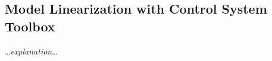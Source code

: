 \subsection{Model Linearization with Control System Toolbox}\label{app:linearization}
    \dots\textit{explanation}\dots
